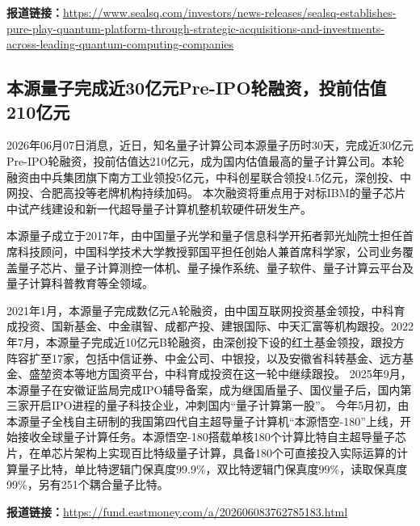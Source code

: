 \documentclass[12pt,a4paper]{ctexart}
\begin{document}
\noindent\textbf{报道链接：}\url{https://www.sealsq.com/investors/news-releases/sealsq-establishes-pure-play-quantum-platform-through-strategic-acquisitions-and-investments-across-leading-quantum-computing-companies}

\subsection{ 本源量子完成近30亿元Pre-IPO轮融资，投前估值210亿元 }

2026年06月07日消息，近日，知名量子计算公司本源量子历时30天，完成近30亿元Pre-IPO轮融资，投前估值达210亿元，成为国内估值最高的量子计算公司。本轮融资由中兵集团旗下南方工业领投5亿元，中科创星联合领投4.5亿元，深创投、中网投、合肥高投等老牌机构持续加码。 本次融资将重点用于对标IBM的量子芯片中试产线建设和新一代超导量子计算机整机软硬件研发生产。 

本源量子成立于2017年，由中国量子光学和量子信息科学开拓者郭光灿院士担任首席科技顾问，中国科学技术大学教授郭国平担任创始人兼首席科学家，公司业务覆盖量子芯片、量子计算测控一体机、量子操作系统、量子软件、量子计算云平台及量子计算科普教育等全领域。

2021年1月，本源量子完成数亿元A轮融资，由中国互联网投资基金领投，中科育成投资、国新基金、中金祺智、成都产投、建银国际、中天汇富等机构跟投。2022年7月，本源量子完成近10亿元B轮融资，由深创投下设的红土基金领投，跟投方阵容扩至17家，包括中信证券、中金公司、中银投，以及安徽省科转基金、远方基金、盛堃资本等地方国资平台，中科育成投资在这一轮中继续跟投。 2025年9月，本源量子在安徽证监局完成IPO辅导备案，成为继国盾量子、国仪量子后，国内第三家开启IPO进程的量子科技企业，冲刺国内“量子计算第一股”。 今年5月初，由本源量子全栈自主研制的我国第四代自主超导量子计算机“本源悟空-180”上线，开始接收全球量子计算任务。本源悟空-180搭载单核180个计算比特自主超导量子芯片，在单芯片架构上实现百比特级量子计算，具备180个可直接投入实际运算的计算量子比特，单比特逻辑门保真度99.9\%，双比特逻辑门保真度99\%，读取保真度99\%，另有251个耦合量子比特。

\noindent\textbf{报道链接：}\url{https://fund.eastmoney.com/a/202606083762785183.html}
\end{document}

